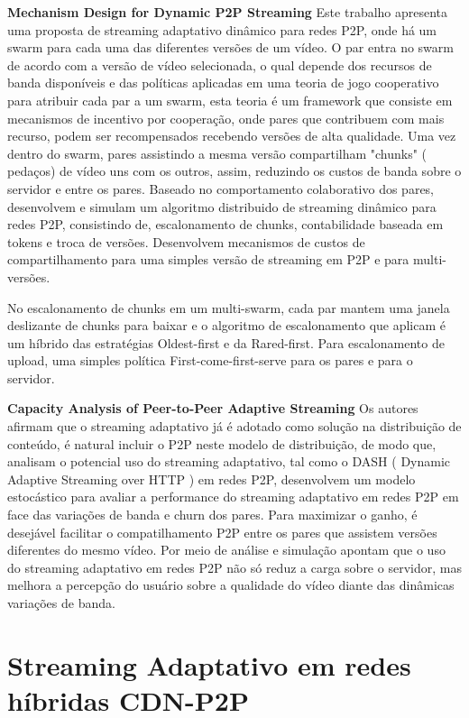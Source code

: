 \documentclass[
	12pt,				%
	oneside,			%
	a4paper,			%
	english,			%
	brazil				%
	]{abntex2ppgsi}
\begin{document}
\textbf{Mechanism Design for Dynamic P2P Streaming}
\newline
Este trabalho apresenta uma proposta de streaming adaptativo dinâmico para redes P2P, onde há um swarm para cada uma das diferentes versões de um vídeo. O par entra no swarm de acordo com a versão de vídeo selecionada, o qual depende dos recursos de banda disponíveis e das políticas aplicadas em uma teoria de jogo cooperativo para atribuir cada par a um swarm, esta teoria é um framework que consiste em mecanismos de incentivo por cooperação, onde pares que contribuem com mais recurso, podem ser recompensados recebendo versões de alta qualidade. Uma vez dentro do swarm, pares assistindo a mesma versão compartilham "chunks" ( pedaços) de vídeo uns com os outros, assim, reduzindo os custos de banda sobre o servidor e entre os pares.
Baseado no comportamento colaborativo dos pares, desenvolvem e simulam um algoritmo distribuido de streaming dinâmico para redes P2P, consistindo de, escalonamento de chunks, contabilidade baseada em tokens e troca de versões.
Desenvolvem mecanismos de custos de compartilhamento para uma simples versão de streaming em P2P e para multi-versões.

No escalonamento de chunks em um multi-swarm, cada par mantem uma janela deslizante de chunks para baixar e o algoritmo de escalonamento que aplicam é um híbrido das estratégias Oldest-first e da Rared-first.
Para escalonamento de upload, uma simples política First-come-first-serve para os pares e para o servidor.

\textbf{Capacity Analysis of Peer-to-Peer Adaptive Streaming}
\newline
Os autores afirmam que o streaming adaptativo já é adotado como solução na distribuição de conteúdo, é natural incluir o P2P neste modelo de distribuição,
de modo que, analisam o potencial uso do streaming adaptativo, tal como o DASH ( Dynamic Adaptive Streaming over HTTP ) em redes P2P, desenvolvem um modelo estocástico para avaliar a performance do streaming adaptativo em redes P2P em face das variações de banda e churn dos pares.
Para maximizar o ganho, é desejável facilitar o compatilhamento P2P entre os pares que assistem versões diferentes do mesmo vídeo.
Por meio de análise e simulação apontam que o uso do streaming adaptativo em redes P2P não só reduz a carga sobre o servidor, mas melhora a percepção do usuário sobre a qualidade do vídeo diante das dinâmicas variações de banda.

\section{Streaming Adaptativo em redes híbridas CDN-P2P}
\end{document}
